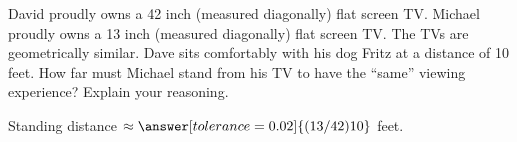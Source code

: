 \documentclass[nooutcomes]{ximera}
\begin{document}
\begin{question}
David proudly owns a 42 inch (measured diagonally) flat screen
  TV. Michael proudly owns a 13 inch (measured diagonally) flat screen
  TV. The TVs are geometrically similar. Dave sits comfortably with his dog 
  Fritz at a distance of 10
  feet. How far must Michael stand from his TV to have the ``same''
  viewing experience?  Explain your reasoning.

Standing distance $\approx \answer[tolerance=0.02]{(13/42)10}$ feet.  
\end{question}

\end{document}
